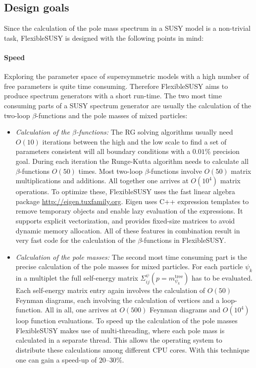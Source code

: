 \documentclass[final,3p,11pt,pdflatex]{elsarticle}
\makeatletter
\newcommand{\fs}{FlexibleSUSY\@\xspace}
\makeatother
\begin{document}
\subsection*{Design goals}

Since the calculation of the pole mass spectrum in a SUSY model is a
non-trivial task, \fs is designed with the following points in mind:

\paragraph{Speed}

Exploring the parameter space of supersymmetric models with a high
number of free parameters is quite time consuming.  Therefore \fs aims
to produce spectrum generators with a short run-time.  The two most
time consuming parts of a SUSY spectrum generator are usually the
calculation of the two-loop $\beta$-functions and the pole masses of
mixed particles:
%
\begin{itemize}
\item \emph{Calculation of the $\beta$-functions:} The RG solving
  algorithms usually need $O(10)$ iterations between the high and the
  low scale to find a set of parameters consistent will all boundary
  conditions with a $0.01\%$ precision goal.  During each iteration
  the Runge-Kutta algorithm needs to calculate all $\beta$-functions
  $O(50)$ times.  Most two-loop $\beta$-functions involve $O(50)$
  matrix multiplications and additions.  All together one arrives at
  $O(10^4)$ matrix operations.  To optimize these, \fs uses the fast
  linear algebra package \href{Eigen}{http://eigen.tuxfamily.org}.
  Eigen uses C++ expression templates to remove temporary objects and
  enable lazy evaluation of the expressions.  It supports explicit
  vectorization, and provides fixed-size matrices to avoid dynamic
  memory allocation.  All of these features in combination result in
  very fast code for the calculation of the $\beta$-functions in \fs.
%
\item \emph{Calculation of the pole masses:} The second most time
  consuming part is the precise calculation of the pole masses for
  mixed particles.  For each particle $\psi_k$ in a multiplet the full
  self-energy matrix $\Sigma^\psi_{ij}(p=m^\text{tree}_{\psi_k})$ has
  to be evaluated.  Each self-energy matrix entry again involves the
  calculation of $O(50)$ Feynman diagrams, each involving the
  calculation of vertices and a loop-function.  All in all, one
  arrives at $O(500)$ Feynman diagrams and $O(10^4)$ loop function
  evaluations.  To speed up the calculation of the pole masses \fs
  makes use of multi-threading, where each pole mass is calculated in
  a separate thread.  This allows the operating system to distribute
  these calculations among different CPU cores.  With this technique
  one can gain a speed-up of $20$--$30\%$.
\end{itemize}
\end{document}
